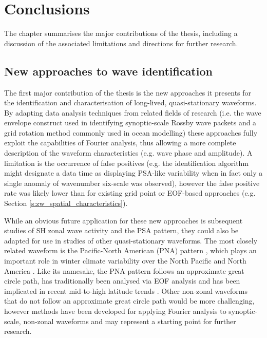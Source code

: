 
\chapter{Conclusions}


\begin{synopsis}

The chapter summarises the major contributions of the thesis, including a discussion of the associated limitations and directions for further research.

\end{synopsis}


\section{New approaches to wave identification}

The first major contribution of the thesis is the new approaches it presents for the identification and characterisation of long-lived, quasi-stationary waveforms. By adapting data analysis techniques from related fields of research (i.e. the wave envelope construct used in identifying synoptic-scale Rossby wave packets and a grid rotation method commonly used in ocean modelling) these approaches fully exploit the capabilities of Fourier analysis, thus allowing a more complete description of the waveform characteristics (e.g. wave phase and amplitude). A limitation is the occurrence of false positives (e.g. the identification algorithm might designate a data time as displaying PSA-like variability when in fact only a single anomaly of wavenumber six-scale was observed), however the false positive rate was likely lower than for existing grid point or EOF-based approaches (e.g. Section \ref{s:zw_spatial_characteristics}).

While an obvious future application for these new approaches is subsequent studies of SH zonal wave activity and the PSA pattern, they could also be adapted for use in studies of other quasi-stationary waveforms. The most closely related waveform is the Pacific-North American (PNA) pattern \citep{Wallace1981}, which plays an important role in winter climate variability over the North Pacific and North America \citep[e.g.][]{Notaro2006}. Like its namesake, the PNA pattern follows an approximate great circle path, has traditionally been analysed via EOF analysis and has been implicated in recent mid-to-high latitude trends \citep[e.g.][]{Ding2014,Liu2015}. Other non-zonal waveforms that do not follow an approximate great circle path would be more challenging, however methods have been developed for applying Fourier analysis to synoptic-scale, non-zonal waveforms \citep{Zimin2006,Souders2014} and may represent a starting point for further research. 

